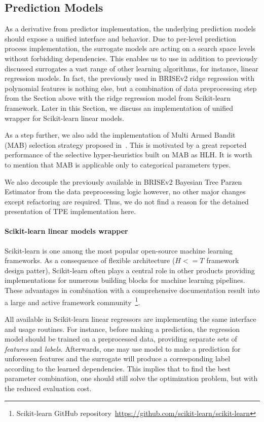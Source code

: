 \subsection{Prediction Models}\label{impl: prediction models}
As a derivative from predictor implementation, the underlying prediction models should expose a unified interface and behavior. Due to per-level prediction process implementation, the surrogate models are acting on a search space levels without forbidding dependencies. This enables us to use in addition to previously discussed surrogates a vast range of other learning algorithms, for instance, linear regression models. In fact, the previously used in BRISEv2 ridge regression with polynomial features is nothing else, but a combination of data preprocessing step from the Section above with the ridge regression model from Scikit-learn framework. Later in this Section, we discuss an implementation of unified wrapper for Scikit-learn linear models.

As a step further, we also add the implementation of Multi Armed Bandit (MAB) selection strategy proposed in~\cite{auer2002finite}. This is motivated by a great reported performance of the selective hyper-heuristics built on MAB as HLH. It is worth to mention that MAB is applicable only to categorical parameters types.

We also decouple the previously available in BRISEv2 Bayesian Tree Parzen Estimator from the data preprocessing logic however, no other major changes except refactoring are required. Thus, we do not find a reason for the detained presentation of TPE implementation here.

\paragraph{Scikit-learn linear models wrapper}
Scikit-learn is one among the most popular open-source machine learning frameworks. As a consequence of flexible architecture ($H<=T$ framework design patter), Scikit-learn often plays a central role in other products providing implementations for numerous building blocks for machine learning pipelines. These advantages in combination with a comprehensive documentation result into a large and active framework community~\footnote{Scikit-learn GitHub repository~\url{https://github.com/scikit-learn/scikit-learn}}.

All available in Scikit-learn linear regressors are implementing the same interface and usage routines. For instance, before making a prediction, the regression model should be trained on a preprocessed data, providing separate sets of \emph{features} and \emph{labels}. Afterwards, one may use model to make a prediction for unforeseen features and the surrogate will produce a corresponding label according to the learned dependencies. This implies that to find the best parameter combination, one should still solve the optimization problem, but with the reduced evaluation cost.

